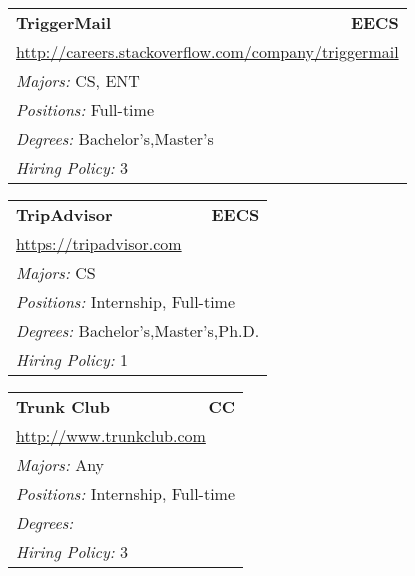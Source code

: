 \documentclass[twoside]{article}
\begin{document}
\begin{center}
\begin{multicols}{3}
\begin{FlushLeft}
\begin{minipage}{.9\columnwidth}
\end{minipage}
 
\begin{minipage}{.9\columnwidth}\begin{tabularx}{.95\columnwidth}{Xr}
                 {\Large\bf TriggerMail} & {\Large\bf EECS}\\
    \multicolumn{2}{p{.95\columnwidth}}{\url{http://careers.stackoverflow.com/company/triggermail}}\\
    \multicolumn{2}{p{.95\columnwidth}}{\emph{Majors:} CS, ENT}\\
    \multicolumn{2}{p{.95\columnwidth}}{\emph{Positions:} Full-time}\\
    \multicolumn{2}{p{.95\columnwidth}}{\emph{Degrees:} Bachelor's,Master's}\\
    \multicolumn{2}{p{.95\columnwidth}}{\emph{Hiring Policy:} 3}\\
    \end{tabularx}
    
\end{minipage}
 
\begin{minipage}{.9\columnwidth}\begin{tabularx}{.95\columnwidth}{Xr}
                 {\Large\bf TripAdvisor} & {\Large\bf EECS}\\
    \multicolumn{2}{p{.95\columnwidth}}{\url{https://tripadvisor.com}}\\
    \multicolumn{2}{p{.95\columnwidth}}{\emph{Majors:} CS}\\
    \multicolumn{2}{p{.95\columnwidth}}{\emph{Positions:} Internship, Full-time}\\
    \multicolumn{2}{p{.95\columnwidth}}{\emph{Degrees:} Bachelor's,Master's,Ph.D.}\\
    \multicolumn{2}{p{.95\columnwidth}}{\emph{Hiring Policy:} 1}\\
    \end{tabularx}
    
\end{minipage}
 
\begin{minipage}{.9\columnwidth}\begin{tabularx}{.95\columnwidth}{Xr}
                 {\Large\bf Trunk Club} & {\Large\bf CC}\\
    \multicolumn{2}{p{.95\columnwidth}}{\url{http://www.trunkclub.com}}\\
    \multicolumn{2}{p{.95\columnwidth}}{\emph{Majors:} Any}\\
    \multicolumn{2}{p{.95\columnwidth}}{\emph{Positions:} Internship, Full-time}\\
    \multicolumn{2}{p{.95\columnwidth}}{\emph{Degrees:} }\\
    \multicolumn{2}{p{.95\columnwidth}}{\emph{Hiring Policy:} 3}\\
    \end{tabularx}
    

\end{minipage}
\end{FlushLeft}
\end{multicols}
\end{center}
\end{document}
